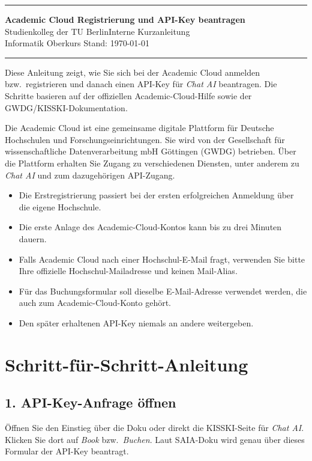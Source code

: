 \documentclass[ngerman,11pt]{article}
\newcommand{\manualtitle}{Academic Cloud Registrierung und API-Key beantragen}
\begin{document}
\hrule
\begin{center}
{\large\bf \manualtitle}\\[-0mm]
Studienkolleg der TU Berlin\hfill Interne Kurzanleitung\\
Informatik Oberkurs \hfill Stand: \today\\
\end{center}
\hrule

\bigskip

Diese Anleitung zeigt, wie Sie sich bei der Academic Cloud anmelden bzw.\ registrieren und danach einen API-Key für \emph{Chat AI} beantragen. Die Schritte basieren auf der offiziellen Academic-Cloud-Hilfe sowie der GWDG/KISSKI-Dokumentation.

Die Academic Cloud ist eine gemeinsame digitale Plattform für Deutsche Hochschulen und Forschungseinrichtungen. Sie wird von der Gesellschaft für wissenschaftliche Datenverarbeitung mbH Göttingen (GWDG) betrieben. Über die Plattform erhalten Sie Zugang zu verschiedenen Diensten, unter anderem zu \emph{Chat AI} und zum dazugehörigen API-Zugang.

\begin{tcolorbox}[title=Wichtig vorab,colback=yellow!6,colframe=yellow!45!black]
\begin{itemize}
\item Die Erstregistrierung passiert bei der ersten erfolgreichen Anmeldung über die eigene Hochschule.
\item Die erste Anlage des Academic-Cloud-Kontos kann bis zu drei Minuten dauern.
\item Falls Academic Cloud nach einer Hochschul-E-Mail fragt, verwenden Sie bitte Ihre offizielle Hochschul-Mailadresse und keinen Mail-Alias.
\item Für das Buchungsformular soll dieselbe E-Mail-Adresse verwendet werden, die auch zum Academic-Cloud-Konto gehört.
\item Den später erhaltenen API-Key niemals an andere weitergeben.
\end{itemize}
\end{tcolorbox}

\section*{Schritt-für-Schritt-Anleitung}

\subsection*{1. API-Key-Anfrage öffnen}
Öffnen Sie den Einstieg über die Doku oder direkt die KISSKI-Seite für \emph{Chat AI}. Klicken Sie dort auf \emph{Book} bzw.\ \emph{Buchen}. Laut SAIA-Doku wird genau über dieses Formular der API-Key beantragt.
\end{document}
